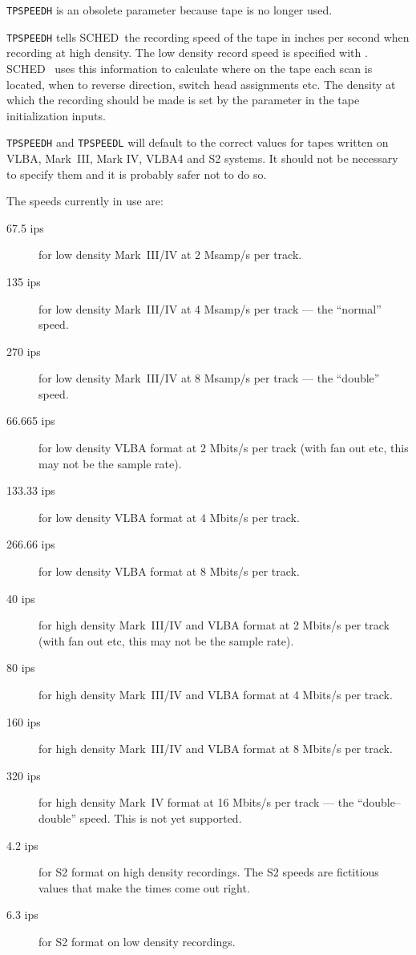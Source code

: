 \documentclass{report}
\newcommand{\schedb}{{\sc SCHED~}}
\begin{document}
{\tt TPSPEEDH} is an obsolete parameter because tape is no longer used.

{\tt TPSPEEDH} tells \schedb the recording speed of the tape in inches
per second when recording at high density.  The low density record
speed is specified with . \schedb
uses this information to calculate where on the tape each scan is
located, when to reverse direction, switch head assignments etc.  The
density at which the recording should be made is set by the
 parameter in the tape
initialization inputs.

{\tt TPSPEEDH} and {\tt TPSPEEDL} will default to the correct values
for tapes written on VLBA, Mark~III, Mark IV, VLBA4 and S2 systems.  It
should not be necessary to specify them and it is probably safer not
to do so.

The speeds currently in use are:

\begin{description}
\item[67.5 ips] for low density Mark~III/IV at 2 Msamp/s per track.
\item[135 ips] for low density Mark~III/IV at 4 Msamp/s per track ---
               the ``normal'' speed.
\item[270 ips] for low density Mark~III/IV at 8 Msamp/s per track ---
               the ``double'' speed.
\item[66.665 ips] for low density VLBA format at 2 Mbits/s per track
               (with fan out etc, this may not be the sample rate).
\item[133.33 ips] for low density VLBA format at 4 Mbits/s per track.
\item[266.66 ips] for low density VLBA format at 8 Mbits/s per track.
\item[40 ips] for high density Mark~III/IV and VLBA format at 2 Mbits/s
               per track (with fan out etc, this may not be the
               sample rate).
\item[80 ips] for high density Mark~III/IV and VLBA format at 4 Mbits/s
              per track.
\item[160 ips] for high density Mark~III/IV and VLBA format at 8 Mbits/s
              per track.
\item[320 ips] for high density Mark~IV format at 16 Mbits/s per
              track --- the ``double--double'' speed.  This is not
              yet supported.
\item[4.2 ips] for S2 format on high density recordings.  The S2
              speeds are fictitious values that make the times come
              out right.
\item[6.3 ips] for S2 format on low density recordings.
\end{description}
\end{document}
